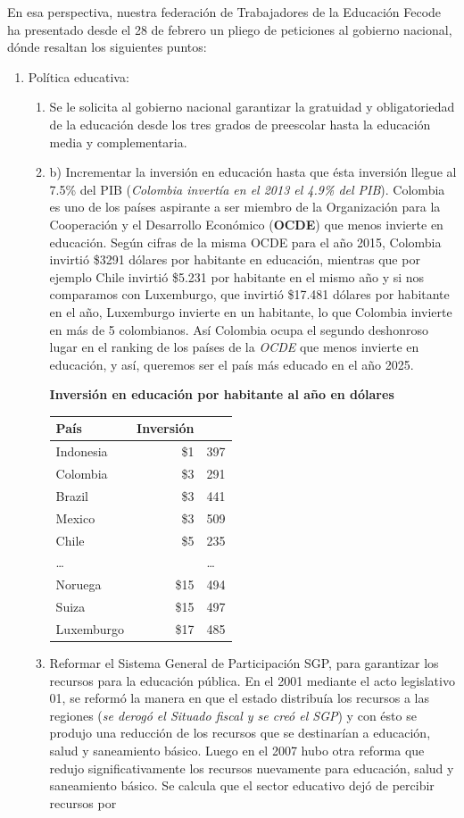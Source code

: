 \documentclass[10pt,twoside]{article}
\begin{document}
En esa perspectiva, nuestra federación de Trabajadores de la Educación Fecode ha presentado desde el 28 de febrero un pliego de peticiones al gobierno nacional, dónde resaltan los siguientes puntos:
\begin{enumerate}
\item Política educativa:
\begin{enumerate}
\item Se le solicita al gobierno nacional garantizar la gratuidad y obligatoriedad de la educación desde los tres grados de preescolar hasta la educación media y complementaria.
\item  b) Incrementar la inversión en educación hasta que ésta inversión llegue al 7.5\% del PIB (\textit{Colombia invertía en el 2013 el 4.9\% del PIB}). Colombia es uno de los países aspirante a ser miembro de la Organización para la Cooperación y el Desarrollo Económico (\textbf{OCDE}) que menos invierte en educación. Según cifras de la misma OCDE para el año 2015, Colombia invirtió \$3291 dólares por habitante en educación, mientras que por ejemplo Chile invirtió \$5.231 por habitante en el mismo año y si nos comparamos con  Luxemburgo, que invirtió \$17.481 dólares por habitante en el año, Luxemburgo invierte en un habitante, lo que Colombia invierte en más de 5 colombianos. Así Colombia ocupa el segundo deshonroso lugar en el ranking de los países de la \textit{OCDE} que menos invierte en educación, y así, queremos ser el país más educado en el año 2025.
\begin{center}
\textbf{Inversión en educación por habitante al año en dólares}
\begin{tabular}{|l|r@{.}l|}
\hline 
\textbf{País} & \textbf{Inversión} \\ 
\hline 
Indonesia & \$1&397 \\ 
\hline 
Colombia & \$3&291 \\ 
\hline 
Brazil & \$3&441 \\ 
\hline 
Mexico & \$3&509 \\ 
\hline 
Chile & \$5&235 \\ 
\hline 
\ldots & &\ldots \\ 
\hline 
Noruega & \$15&494 \\ 
\hline 
Suiza & \$15&497 \\ 
\hline 
Luxemburgo & \$17&485 \\ 
\hline 
\end{tabular} 
\end{center}
\item Reformar el Sistema General de Participación SGP, para garantizar los recursos para la educación pública. En el 2001 mediante el acto legislativo 01, se reformó la manera en que el estado distribuía los recursos a las regiones (\emph{se derogó el Situado fiscal y se creó el SGP}) y con ésto se produjo una reducción de los recursos que se destinarían a educación, salud y saneamiento básico. Luego en el 2007 hubo otra reforma que redujo significativamente los recursos nuevamente para educación, salud y saneamiento básico. Se calcula que el sector educativo dejó de percibir recursos por 

\end{enumerate}
\end{enumerate}
\end{document}
